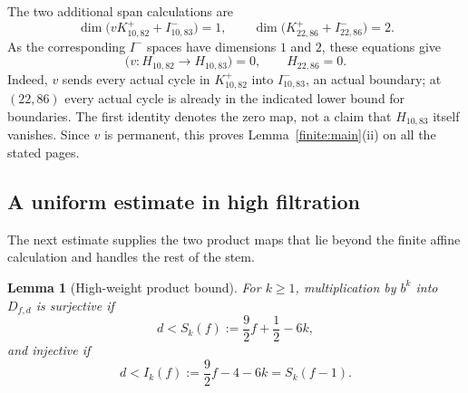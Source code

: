 \documentclass[11pt]{article}
\newtheorem{lemma}[theorem]{Lemma}
\theoremstyle{definition}
\theoremstyle{remark}
\numberwithin{equation}{section}
\begin{document}
The two additional span calculations are
\begin{equation}\label{finite:span-dimensions}
 \dim\bigl(vK^+_{10,82}+I^-_{10,83}\bigr)=1,
 \qquad
 \dim\bigl(K^+_{22,86}+I^-_{22,86}\bigr)=2.
\end{equation}
As the corresponding $I^-$ spaces have dimensions $1$ and $2$,
these equations give
\begin{equation}\label{finite:first-consequences}
 \bigl(v\colon H_{10,82}\longrightarrow H_{10,83}\bigr)=0,
 \qquad H_{22,86}=0.
\end{equation}
Indeed, $v$ sends every actual cycle in $K^+_{10,82}$ into
$I^-_{10,83}$, an actual boundary; at $(22,86)$ every actual cycle
is already in the indicated lower bound for boundaries.  The first
identity denotes the zero map, not a claim that $H_{10,83}$ itself
vanishes.  Since $v$ is permanent, this proves
Lemma~\ref{finite:main}\textup{(ii)} on all the stated pages.

\subsection{A uniform estimate in high filtration}

The next estimate supplies the two product maps that lie beyond
the finite affine calculation and handles the rest of the stem.

\begin{samepage}
\begin{lemma}[High-weight product bound]\label{finite:highweight}
For $k\geq1$, multiplication by $b^k$ into $D_{f,d}$ is surjective if
\begin{equation}\label{finite:surjective-bound}
 d<S_k(f):=\frac92f+\frac12-6k,
\end{equation}
and injective if
\begin{equation}\label{finite:injective-bound}
 d<I_k(f):=\frac92f-4-6k=S_k(f-1).
\end{equation}
\end{lemma}
\end{samepage}
\end{document}
